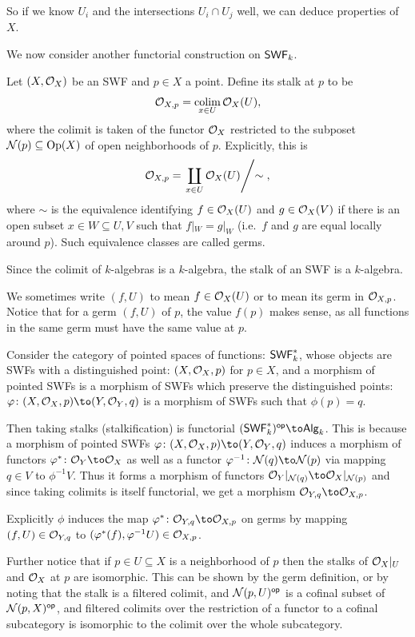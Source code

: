 So if we know $U_i$ and the intersections $U_i\cap U_j$ well, we can deduce properties of $X$.

We now consider another functorial construction on ${\sf SWF}_k$.

\bdefn

    Let $(X,{{\cal O}}_X)$ be an SWF and $p\in X$ a point.
    Define its {\emphcolor stalk} at $p$ to be
    $$ {{\cal O}}_{X,p} = \mathop{\rm colim}\limits_{x\in U}{{\cal O}}_X(U) , $$
    where the colimit is taken of the functor ${{\cal O}}_X$ restricted to the subposet ${{\cal N}}(p)\subseteq{\rm Op}(X)$ of open neighborhoods of $p$.
    Explicitly, this is
    $$ {{\cal O}}_{X,p} = \left.\coprod_{x\in U}{{\cal O}}_X(U)\middle/{\sim}\right. , $$
    where $\sim$ is the equivalence identifying $f\in{{\cal O}}_X(U)$ and $g\in{{\cal O}}_X(V)$ if there is an open subset $x\in W\subseteq U,V$ such that $f|_W=g|_W$ (i.e.\ $f$ and $g$ are equal
    locally around $p$).
    Such equivalence classes are called {\emphcolor germs}.

\edefn

Since the colimit of $k$-algebras is a $k$-algebra, the stalk of an SWF is a $k$-algebra.

We sometimes write $(f,U)$ to mean $f\in{{\cal O}}_X(U)$ or to mean its germ in ${{\cal O}}_{X,p}$.
Notice that for a germ $(f,U)$ of $p$, the value $f(p)$ makes sense, as all functions in the same germ must have the same value at $p$.

Consider the category of {\emphcolor pointed spaces of functions}: ${\sf SWF}_k^*$, whose objects are SWFs with a distinguished point: $(X,{{\cal O}}_X,p)$ for $p\in X$,
and a morphism of pointed SWFs is a morphism of SWFs which preserve the distinguished points: $\phi\colon(X,\O_X,p)\to(Y,\O_Y,q)$ is a morphism of SWFs such that $\phi(p)=q$.

Then taking stalks ({\emphcolor stalkification}) is functorial $(\SWF_k^*)^\op\to\Alg_k$.
This is because a morphism of pointed SWFs $\phi\colon(X,\O_X,p)\to(Y,\O_Y,q)$ induces a morphism of functors $\phi^*\colon\O_Y\to\O_X$ as well as a functor $\phi^{-1}\colon\N(q)\to\N(p)$ via
mapping $q\in V$ to $\phi^{-1}V$.
Thus it forms a morphism of functors $\O_Y|_{\N(q)}\to\O_X|_{\N(p)}$ and since taking colimits is itself functorial, we get a morphism $\O_{Y,q}\to\O_{X,p}$.

Explicitly $\phi$ induces the map $\phi^*\colon\O_{Y,q}\to\O_{X,p}$ on germs by mapping $(f,U)\in{{\cal O}}_{Y,q}$ to $(\varphi^*(f),\varphi^{-1}U)\in{{\cal O}}_{X,p}$.

Further notice that if $p\in U\subseteq X$ is a neighborhood of $p$ then the stalks of ${{\cal O}}_X|_U$ and ${{\cal O}}_X$ at $p$ are isomorphic.
This can be shown by the germ definition, or by noting that the stalk is a filtered colimit, and ${{\cal N}}(p,U)^{\sf op}$ is a cofinal subset of ${{\cal N}}(p,X)^{\sf op}$, and filtered colimits over the restriction
of a functor to a cofinal subcategory is isomorphic to the colimit over the whole subcategory.

